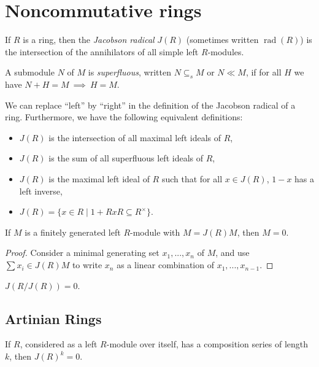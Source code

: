 \documentclass[letterpaper,11pt]{report}
\DeclareMathOperator{\rad}{rad}
\begin{document}
\section{Noncommutative rings}

\begin{defn} If $R$ is a ring, then the \emph{Jacobson radical} $J(R)$ (sometimes written $\rad(R)$) is the intersection of the annihilators of all simple left $R$-modules.
\end{defn}

\begin{defn} A submodule $N$ of $M$ is \emph{superfluous}, written $N \subseteq_s M$ or $N \ll M$, if for all $H$ we have $N+H = M\ \implies\ H = M$.
\end{defn}

\begin{thm} We can replace ``left'' by ``right'' in the definition of the Jacobson radical of a ring. Furthermore, we have the following equivalent definitions:
\begin{itemize}
\item $J(R)$ is the intersection of all maximal left ideals of $R$,
\item $J(R)$ is the sum of all superfluous left ideals of $R$,
\item $J(R)$ is the maximal left ideal of $R$ such that for all $x \in J(R)$, $1-x$ has a left inverse,
\item $J(R) = \{x \in R \mid 1+RxR \subseteq R^\times\}$.
\end{itemize}
\end{thm}

\begin{lem} If $M$ is a finitely generated left $R$-module with $M = J(R)M$, then $M=0$.
\end{lem}
\begin{proof} Consider a minimal generating set $x_1, ..., x_n$ of $M$, and use $\sum x_i \in J(R)M$ to write $x_n$ as a linear combination of $x_1, ..., x_{n-1}$.
\end{proof}

\begin{prop} $J(R/J(R)) = 0$.
\end{prop}

\subsection{Artinian Rings}

\begin{prop} If $R$, considered as a left $R$-module over itself, has a composition series of length $k$, then $J(R)^k = 0$.
\end{prop}
\end{document}
